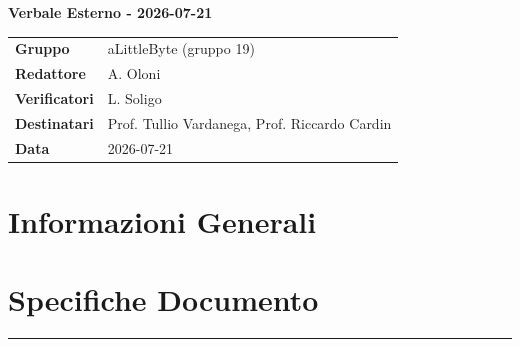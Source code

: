 \documentclass[a4paper,12pt]{article}
\begin{document}
\thispagestyle{firstpage}

\vspace*{0.5cm}

\begin{center}
    {\LARGE \textbf{Verbale Esterno - 2026-07-21}}
\end{center}

\vspace{1.5cm}

\begin{center}
    \renewcommand{\arraystretch}{1.3}
    \begin{tcolorbox}[
        width=0.92\textwidth,
        colback=gray!6,
        colframe=gray!45,
        boxrule=0.5pt,
        arc=2mm,
        boxsep=0pt,
        left=8pt, right=8pt, top=8pt, bottom=8pt
    ]
        \begin{tabularx}{\linewidth}{>{\bfseries}p{3.5cm} X}
            Gruppo      & aLittleByte (gruppo 19) \\
            Redattore   & A. Oloni \\
            Verificatori& L. Soligo\\
            Destinatari & Prof. Tullio Vardanega, Prof. Riccardo Cardin \\
            Data        & 2026-07-21\\
        \end{tabularx}
    \end{tcolorbox}
\end{center}

\newpage

\tableofcontents
\newpage

\section{Informazioni Generali}
\section*{Specifiche Documento}
\hrule
\vspace{1cm}
\end{document}
